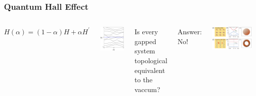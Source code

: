 \begin{frame}
    \frametitle{Quantum Hall Effect}
    \begin{columns}
        \begin{block}{}
            \begin{equation}
                H(\alpha) = (1-\alpha)H + \alpha H^{\prime} \nonumber
            \end{equation}
        \end{block}
        \begin{center}
            \includegraphics[width=.7\textwidth]{phases_of_matter/equivalent_gapped_hamiltonians.png}
        \end{center}

        \pause
        Is every gapped system topological equivalent to the vaccum?
        \pause

        Answer: No!
        \begin{block}{}
            \includegraphics[width=\textwidth]{phases_of_matter/non_equivalent_systems.png}
        \end{block}
    \end{columns}

\end{frame}


